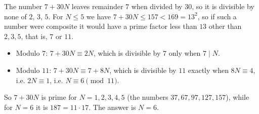 The number $7+30N$ leaves remainder $7$ when divided by $30$, so it is divisible by none of $2$, $3$, $5$. For $N\le5$ we have $7+30N\le157<169=13^2$, so if such a number were composite it would have a prime factor less than $13$ other than $2,3,5$, that is, $7$ or $11$.
\begin{itemize}
\item Modulo $7$: $7+30N\equiv2N$, which is divisible by $7$ only when $7\mid N$.
\item Modulo $11$: $7+30N\equiv7+8N$, which is divisible by $11$ exactly when $8N\equiv4$, i.e. $2N\equiv1$, i.e. $N\equiv6\pmod{11}$.
\end{itemize}
So $7+30N$ is prime for $N=1,2,3,4,5$ (the numbers $37,67,97,127,157$), while for $N=6$ it is $187=11\cdot17$. The answer is $\boxed{N=6}$.
